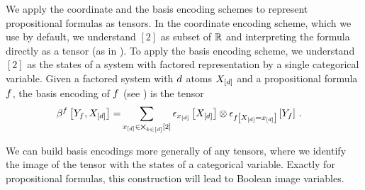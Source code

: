 We apply the coordinate and the basis encoding schemes to represent propositional formulas as tensors.
In the coordinate encoding scheme, which we use by default, we understand $[2]$ as subset of $\mathbb{R}$ and interpreting the formula directly as a tensor (as in ).
To apply the basis encoding scheme, we understand $[2]$ as the states of a system with factored representation by a single categorical variable.
Given a factored system with $d$ atoms $X_{[d]}$ and a propositional formula $f$, the basis encoding of $f$ (see ) is the tensor
\begin{align}
    \beta^{f}\left[Y_{f},X_{[d]}\right]
    = & \sum_{x_{[d]}\in\bigtimes_{k\in[d]}[2]}  \epsilon_{x_{[d]}}\left[X_{[d]}\right] \otimes \epsilon_{f\left[X_{[d]}=x_{[d]}\right]}\left[Y_{f}\right] \, .
\end{align}

We can build basis encodings more generally of any tensors, where we identify the image of the tensor with the states of a categorical variable.
Exactly for propositional formulas, this construction will lead to Boolean image variables.


